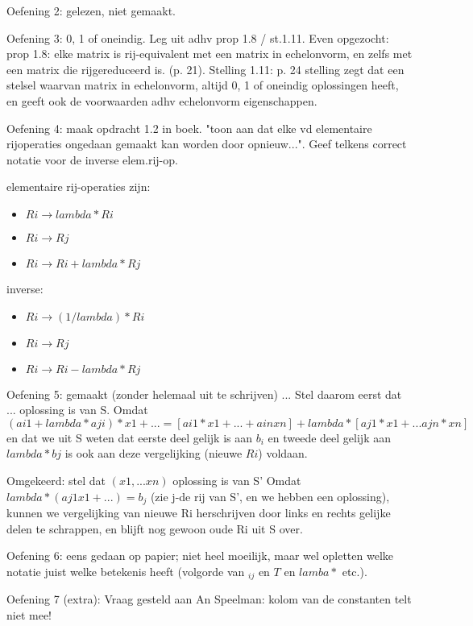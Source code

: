 \documentclass{article}
\begin{document}
Oefening 2: gelezen, niet gemaakt. 

Oefening 3: 0, 1 of oneindig. Leg uit adhv prop 1.8 / st.1.11. Even opgezocht: prop 1.8: elke matrix is rij-equivalent met een matrix in echelonvorm, en zelfs met een matrix die rijgereduceerd is. (p. 21). Stelling 1.11: p. 24
stelling zegt dat een stelsel waarvan matrix in echelonvorm, altijd 0, 1 of oneindig oplossingen heeft, en geeft ook de voorwaarden adhv echelonvorm eigenschappen. 

Oefening 4: maak opdracht 1.2 in boek. "toon aan dat  elke vd elementaire rijoperaties ongedaan gemaakt kan worden door opnieuw...". Geef telkens correct notatie voor de inverse elem.rij-op. 

elementaire rij-operaties zijn: 
\begin{itemize}
\item $Ri \rightarrow  lambda * Ri $
\item $Ri \rightarrow Rj$
\item $Ri \rightarrow Ri + lambda*Rj$
\end{itemize}

inverse: 
\begin{itemize}
\item $Ri \rightarrow  (1/lambda) * Ri $
\item $Ri \rightarrow Rj$
\item $Ri \rightarrow Ri - lambda*Rj$
\end{itemize}

Oefening 5: gemaakt (zonder helemaal uit te schrijven) 
...
Stel daarom eerst dat ... oplossing is van S. Omdat 
$
(ai1 + lambda*aji) * x1 + ... 
= 
[ ai1 * x1 + ... + ain xn  ] + lambda* [ aj1 * x1 + ... ajn * xn] $
en dat we uit S weten dat 
eerste deel gelijk is aan $b_i$ 
en tweede deel gelijk aan $lambda*bj$
is ook aan deze vergelijking (nieuwe $Ri$) voldaan. 

Omgekeerd: stel dat $(x1,...xn)$ oplossing is van S' 
Omdat $lambda*(aj1x1 + ...) = b_j $ (zie j-de rij van S', en we hebben een oplossing),
kunnen we vergelijking van nieuwe Ri herschrijven door links en rechts gelijke delen te schrappen,
en blijft nog gewoon oude Ri uit S over. 

Oefening 6: 
eens gedaan op papier; niet heel moeilijk, maar wel opletten welke notatie juist welke betekenis heeft (volgorde van $_{ij}$ en $T$ en $lamba*$ etc.). 

Oefening 7 (extra): 
Vraag gesteld aan An Speelman: kolom van de constanten telt niet mee! 
\end{document}
